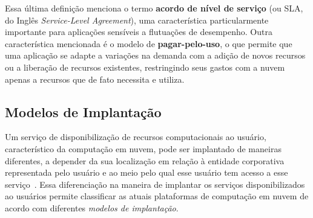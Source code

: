 Essa última definição menciona o termo \textbf{acordo de nível de serviço} (ou SLA, do Inglês \emph{Service-Level Agreement}), uma característica particularmente importante para aplicações sensíveis a flutuações 
de desempenho. Outra característica mencionada é o modelo de \textbf{pagar-pelo-uso}, 
o que permite que uma aplicação se adapte a variações na demanda com a adição de 
novos recursos ou a liberação de recursos existentes, restringindo seus gastos 
com a nuvem apenas a recursos que de fato necessita e utiliza.

\subsection{Modelos de Implantação}

Um serviço de disponibilização de recursos computacionais ao usuário, característico da computação em nuvem, pode ser implantado de maneiras diferentes,
a depender da sua localização em relação à entidade corporativa representada pelo
usuário e ao meio pelo qual esse usuário tem acesso a esse 
serviço~\cite{armbrust2009above,Zhang2010}. Essa diferenciação na maneira de implantar os serviços disponibilizados ao usuários permite classificar as atuais plataformas de computação em nuvem de acordo com diferentes \emph{modelos de implantação}. 
 
